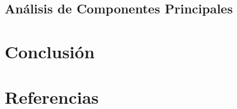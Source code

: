 \documentclass[a4paper]{tufte-handout}
\begin{document}
\subsection[Análisis de Componentes Principales] {Análisis de Componentes Principales}


\section[Conclusión] {{\normalfont Conclusión}}




\section{{\normalfont Referencias}}

\end{document}
